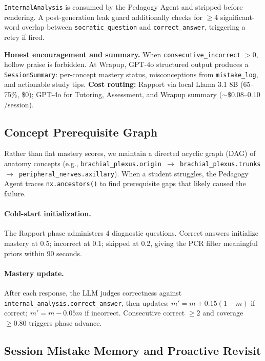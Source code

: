 \documentclass[11pt]{article}
\begin{document}
\texttt{InternalAnalysis} is consumed by the Pedagogy Agent and stripped
before rendering.
A post-generation leak guard additionally checks for $\geq$4 significant-word
overlap between \texttt{socratic\_question} and \texttt{correct\_answer},
triggering a retry if fired.

\textbf{Honest encouragement and summary.}
When \texttt{consecutive\_incorrect} $> 0$, hollow praise is forbidden.
At Wrapup, GPT-4o structured output produces a \texttt{SessionSummary}:
per-concept mastery status, misconceptions from \texttt{mistake\_log}, and
actionable study tips.
\textbf{Cost routing:} Rapport via local Llama 3.1 8B (65--75\%, \$0);
GPT-4o for Tutoring, Assessment, and Wrapup summary (${\sim}\$0.08$--$0.10$/session).

\subsection{Concept Prerequisite Graph}

Rather than flat mastery scores, we maintain a directed acyclic graph (DAG)
of anatomy concepts (e.g., \texttt{brachial\_plexus.origin $\to$
brachial\_plexus.trunks $\to$ peripheral\_nerves.axillary}).
When a student struggles, the Pedagogy Agent traces \texttt{nx.ancestors()}
to find prerequisite gaps that likely caused the failure.

\paragraph{Cold-start initialization.}
The Rapport phase administers 4 diagnostic questions.
Correct answers initialize mastery at 0.5; incorrect at 0.1; skipped at 0.2,
giving the PCR filter meaningful priors within 90 seconds.

\paragraph{Mastery update.}
After each response, the LLM judges correctness against
\texttt{internal\_analysis.correct\_answer}, then updates:
$m' = m + 0.15(1-m)$ if correct; $m' = m - 0.05m$ if incorrect.
Consecutive correct $\geq 2$ and coverage $\geq 0.80$ triggers phase advance.

\subsection{Session Mistake Memory and Proactive Revisit}
\label{sec:memory}
\end{document}
